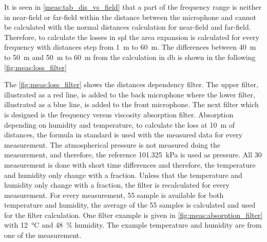It is seen in \autoref{meas:tab_dis_vs_field} that a part of the frequency range is neither in near-field or far-field within the distance between the microphone and cannot be calculated with the normal distances calculation for near-field and far-field. Therefore, to calculate the losses in \gls{spl} the area expansion is calculated for every frequency with distances step from \SI{1}{\meter} to \SI{60}{\meter}. The differences between \SI{40}{\meter} to \SI{50}{\meter} and \SI{50}{\meter} to \SI{60}{\meter} from the calculation in \si{\decibel} is shown in the following \autoref{fig:meas:loss_filter}


The \autoref{fig:meas:loss_filter} shows the distances dependency filter. The upper filter, illustrated as a red line, is added to the back microphone where the lower filter, illustrated as a blue line, is added to the front microphone. The next filter which is designed is the frequency versus viscosity absorption filter. 
Absorption depending on humidity and temperature, to calculate the loss at \SI{10}{\meter} of distances, the formula in standard \citep{iso_9613-1} is used with the measured data for every measurement. The atmospherical pressure is not measured doing the measurement, and therefore, the reference \SI{101.325}{\kilo\pascal} is used as pressure. All 30 measurement is done with short time differences and therefore, the temperature and humidity only change with a fraction. Unless that the temperature and humidity only change with a fraction, the filter is recalculated for every measurement. For every measurement, 55 sample is available for both temperature and humidity, the average of the 55 samples is calculated and used for the filter calculation. One filter example is given in \autoref{fig:meas:absorption_filter} with \SI{12}{\celsius} and \SI{48}{\percent} humidity. The example temperature and humidity are from one of the measurement.

  
